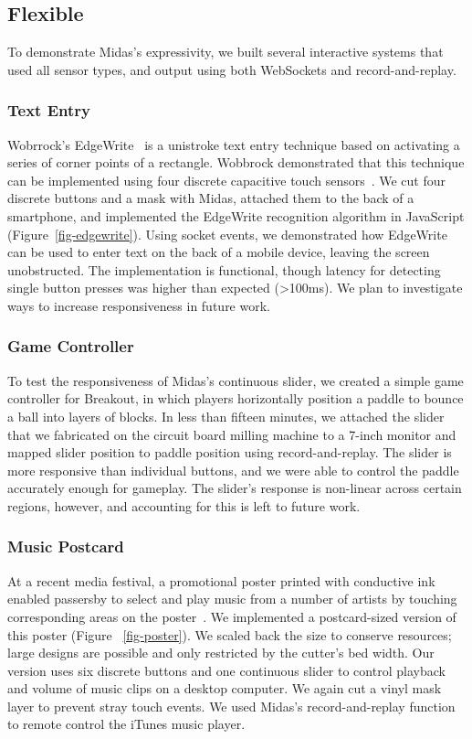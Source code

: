     \subsection{Flexible}
    
    To demonstrate Midas's expressivity, we built several interactive systems that used all sensor types, and output using both WebSockets and record-and-replay.
    
        \subsubsection{Text Entry}
Wobrrock's EdgeWrite~\cite{wobbrock-edgewrite} is a unistroke text entry technique based on activating a series of corner points of a rectangle. Wobbrock demonstrated that this technique can be implemented using four discrete capacitive touch sensors~\cite{edgewrite-cap}. We cut four discrete buttons and a mask with Midas, attached them to the back of a smartphone, and implemented the EdgeWrite recognition algorithm in JavaScript (Figure~\ref{fig-edgewrite}). Using socket events, we demonstrated how EdgeWrite can be used to enter text on the back of a mobile device, leaving the screen unobstructed. The implementation is functional, though latency for detecting single button presses was higher than expected (\textgreater 100ms). We plan to investigate ways to increase responsiveness in future work. 

        \subsubsection{Game Controller}
To test the responsiveness of Midas's continuous slider, we created a simple game controller for Breakout, in which players horizontally position a paddle to bounce a ball into layers of blocks. In less than fifteen minutes, we attached the slider that we fabricated on the circuit board milling machine to a 7-inch monitor and mapped slider position to paddle position using record-and-replay.
The slider is more responsive than individual buttons, and we were able to control the paddle accurately enough for gameplay.  The slider's response is non-linear across certain regions, however, and accounting for this is left to future work.

        \subsubsection{Music Postcard}
At a recent media festival, a promotional poster printed with conductive ink enabled passersby to select and play music from a number of artists by touching corresponding areas on the poster~\cite{paperposter}. We implemented a postcard-sized version of this poster (Figure ~\ref{fig-poster}).  We scaled back the size to conserve resources; large designs are possible and only restricted by the cutter's bed width. Our version uses six discrete buttons and one continuous slider to control playback and volume of music clips on a desktop computer. We again cut a vinyl mask layer to prevent stray touch events. We used Midas's record-and-replay function to remote control the iTunes music player.

